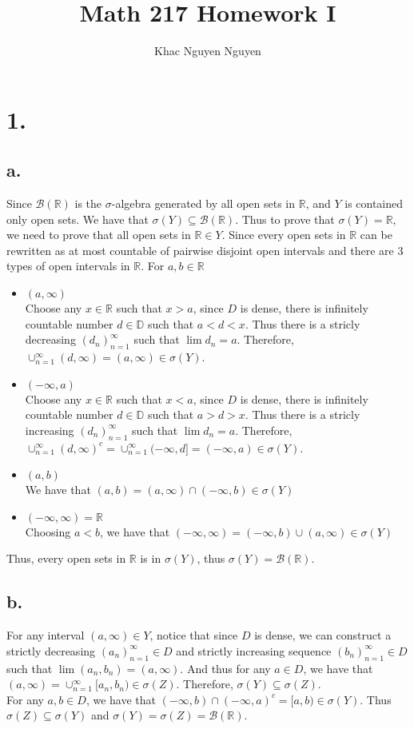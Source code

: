 \documentclass[11pt]{article}
\title{\textbf{Math 217 Homework I}}
\author{Khac Nguyen Nguyen}
\date{}
\theoremstyle{mystyle}
\theoremstyle{definition}
\begin{document}
\section*{1.}
\subsection*{a.}
Since $\mathcal{B}(\mathbb{R})$ is the $\sigma$-algebra generated by all open sets in $\mathbb{R}$, and $Y$ is contained only open sets. We have that $\sigma(Y) \subseteq \mathcal{B}(\mathbb{R})$. Thus to prove that $\sigma(Y) = \mathbb{R}$, we need to prove that all open sets in $\mathbb{R} \in Y$. Since every open sets in $\mathbb{R}$ can be rewritten as at most countable of pairwise disjoint open intervals and there are 3 types of open intervals in $\mathbb{R}$. For $a, b \in \mathbb{R}$ 
\begin{itemize}
  \item $(a,\infty)$ \\
    Choose any $x \in \mathbb{R}$ such that $x>a$, since $D$ is dense, there is infinitely countable number $d \in \mathbb{D}$ such that $a<d<x$. Thus there is a stricly decreasing $(d_n)_{n=1}^\infty$ such that $\lim d_n = a$. Therefore, $\cup_{n=1}^\infty (d, \infty) = (a, \infty) \in \sigma(Y)$.    
  \item $(-\infty, a)$ \\
    Choose any $x \in \mathbb{R}$ such that $x<a$, since $D$ is dense, there is infinitely countable number $d \in \mathbb{D}$ such that $a>d>x$. Thus there is a stricly increasing $(d_n)_{n=1}^\infty$ such that $\lim d_n = a$. Therefore, $\cup_{n=1}^\infty (d, \infty)^c = \cup_{n=1}^\infty (-\infty, d] = (-\infty, a) \in \sigma(Y)$.    
  \item $(a, b)$ \\
    We have that $(a,b) = (a, \infty) \cap (-\infty, b) \in \sigma(Y)$
  \item $(-\infty, \infty) = \mathbb{R}$ \\
    Choosing $a<b$, we have that 
    $(-\infty, \infty) = (-\infty, b) \cup (a, \infty) \in \sigma(Y)$
\end{itemize}
Thus, every open sets in $\mathbb{R}$ is in $\sigma(Y)$, thus $\sigma(Y) = \mathcal{B}(\mathbb{R})$. 
\subsection*{b.}
For any interval $(a, \infty) \in Y$,  notice that since $D$ is dense, we can construct a strictly decreasing $(a_n)_{n=1}^\infty \in D$ and strictly increasing sequence $(b_n)_{n=1}^\infty \in D$ such that $\lim (a_n, b_n) = (a, \infty)$. And thus for any $a \in D$, we have that $(a, \infty) = \cup_{n=1}^\infty [a_n, b_n) \in \sigma(Z)$. Therefore, $\sigma(Y) \subseteq \sigma(Z)$. \\
For any $a, b \in D$, we have that $(-\infty, b) \cap (-\infty, a)^c = [a, b) \in \sigma(Y)$. Thus $\sigma(Z) \subseteq \sigma(Y)$ and $\sigma(Y) = \sigma(Z) = \mathcal{B}(\mathbb{R})$.  
\end{document}
